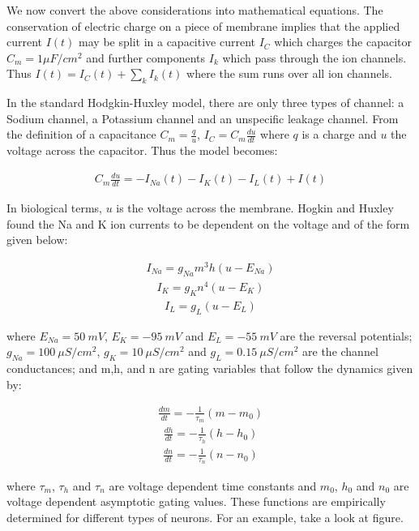 \documentclass[10pt,letterpaper]{article}
\begin{document}
We now convert the above considerations into mathematical equations. The conservation of electric charge on a piece of membrane implies that the applied current $I(t)$ may be split in a capacitive current $I_C$ which charges the capacitor $C_m = 1 \mu F/cm^2$ and further components $I_k$ which pass through the ion channels. Thus $I(t) = I_C(t) + \sum_kI_k(t)$ where the sum runs over all ion channels. 

In the standard Hodgkin-Huxley model, there are only three types of channel: a Sodium channel, a Potassium channel and an unspecific leakage channel. From the definition of a capacitance $C_m=\frac{q}{u}$, $I_C=C_m\frac{du}{dt}$ where $q$ is a charge and $u$ the voltage across the capacitor. Thus the model becomes:

\begin{eqnarray}\label{d3_1}C_m\frac{du}{dt}=−I_{Na}(t)−I_{K}(t)−I_{L}(𝑡)+I(t)\end{eqnarray}

In biological terms, $u$ is the voltage across the membrane. Hogkin and Huxley found the Na and K ion currents to be dependent on the voltage and of the form given below:

\begin{eqnarray}\label{d3_2}I_{Na} = g_{Na}m^3h(u−E_{Na})\end{eqnarray}
\begin{eqnarray}\label{d3_3}I_K = g_Kn^4(u−E_K)\end{eqnarray}
\begin{eqnarray}\label{d3_4}I_L = g_L(u−E_L)\end{eqnarray}

where $E_{Na}=50\ mV$, $E_K = -95\ mV$ and $E_L=-55\ mV$ are the reversal potentials; $g_{Na} = 100\ \mu S/cm^2$, $g_K = 10\ \mu S/cm^2$ and $g_L = 0.15\ \mu S/cm^2$ are the channel conductances; and m,h, and n are gating variables that follow the dynamics given by:

\begin{eqnarray}\label{d3_5}\frac{dm}{dt} = - \frac{1}{\tau_m}(m-m_0)\end{eqnarray}
\begin{eqnarray}\label{d3_6}\frac{dh}{dt} = - \frac{1}{\tau_h}(h-h_0)\end{eqnarray}
\begin{eqnarray}\label{d3_7}\frac{dn}{dt} = - \frac{1}{\tau_n}(n-n_0)\end{eqnarray}

where $\tau_m$, $\tau_h$ and $\tau_n$ are voltage dependent time constants and $m_0$, $h_0$ and $n_0$ are voltage dependent asymptotic gating values. These functions are empirically determined for different types of neurons. For an example, take a look at figure.
\end{document}
